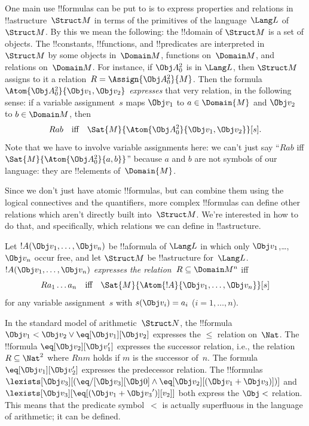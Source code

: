 \documentclass[../../../include/open-logic-section]{subfiles}
\begin{document}


\begin{explain}
One main use !!{formula}s can be put to is to express properties and
relations in !!a{structure}~$\Struct M$ in terms of the primitives of
the language~$\Lang L$ of~$\Struct M$.  By this we mean the following:
the !!{domain} of $\Struct M$ is a set of objects.  The !!{constant}s,
!!{function}s, and !!{predicate}s are interpreted in~$\Struct M$ by
some objects in~$\Domain M$, functions on~$\Domain M$, and relations
on~$\Domain M$.  For instance, if $\Obj A^2_0$ is in $\Lang L$, then
$\Struct M$ assigns to it a relation~$R = \Assign{{\Obj
  A^2_0}}{M}$. Then the formula $\Atom{\Obj A^2_0}{\Obj v_1, \Obj v_2}$
\emph{expresses} that very relation, in the following sense: if a
variable assignment~$s$ maps $\Obj v_1$ to $a \in \Domain{M}$ and
$\Obj v_2$ to $b \in \Domain M$, then
\[
Rab \text{\quad iff\quad} \Sat{M}{\Atom{\Obj A^2_0}{\Obj v_1, \Obj v_2}}[s].
\]
Note that we have to involve variable assignments here: we can't just
say ``$Rab$ iff $\Sat{M}{\Atom{\Obj A^2_0}{a, b}}$'' because $a$ and
  $b$ are not symbols of our language: they are !!{element}s
  of~$\Domain{M}$.

Since we don't just have atomic !!{formula}s, but can combine them
using the logical connectives and the quantifiers, more complex
!!{formula}s can define other relations which aren't directly built
into~$\Struct M$.  We're interested in how to do that, and
specifically, which relations we can define in !!a{structure}.
\end{explain}

\begin{defn}
Let $!A(\Obj v_1,\dots, \Obj v_n)$ be !!a{formula} of $\Lang L$ in
which only $\Obj v_1$,\dots, $\Obj v_n$ occur free, and let $\Struct
M$ be !!a{structure} for~$\Lang L$. $!A(\Obj v_1,\dots, \Obj v_n)$
\emph{expresses the relation}~$R \subseteq \Domain M^n$ iff
\[
Ra_1\dots a_n \text{\quad iff\quad} \Sat{M}{\Atom{!A}{\Obj
    v_1,\dots, \Obj v_n}}[s]
\]
for any variable assignment~$s$ with $s(\Obj v_i) = a_i$ ($i = 1,
\dots, n$).
\end{defn}

\begin{ex}
In the standard model of arithmetic~$\Struct N$, the !!{formula} $\Obj
v_1 < \Obj v_2 \lor \eq[\Obj v_1][\Obj v_2]$ expresses the $\le$
relation on~$\Nat$. The !!{formula} $\eq[\Obj v_2][\Obj v_1']$
expresses the successor relation, i.e., the relation $R \subseteq
\Nat^2$ where $Rnm$ holds if $m$ is the successor of~$n$. The formula
$\eq[\Obj v_1][\Obj v_2']$ expresses the predecessor relation.  The
!!{formula}s $\lexists[\Obj v_3][(\eq/[\Obj v_3][\Obj 0] \land
  \eq[\Obj v_2][(\Obj v_1 + \Obj v_3)])]$ and $\lexists[\Obj
  v_3][\eq[(\Obj v_1 + {\Obj v_3}')][v_2]]$ both express the $\Obj <$
relation.  This means that the predicate symbol~$<$ is actually
superfluous in the language of arithmetic; it can be defined.
\end{ex}
\end{document}
